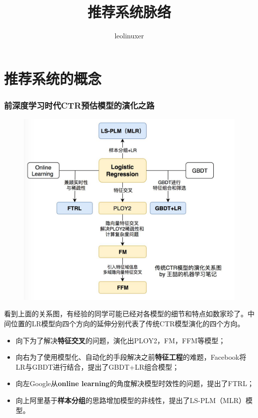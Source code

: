 \documentclass[12pt]{article}
\title{推荐系统脉络\cite{Deep_Learning_Recommender_System}}
\author{leolinuxer}
\begin{document}
\maketitle
\tableofcontents

\part{推荐系统的概念}
\section{前深度学习时代CTR预估模型的演化之路}
\begin{figure}[H]
    \centering
    \includegraphics[width=1\textwidth]{fig/Traditional_CTR_Model_Evolution.jpg}
\end{figure}

看到上面的关系图，有经验的同学可能已经对各模型的细节和特点如数家珍了。中间位置的LR模型向四个方向的延伸分别代表了传统CTR模型演化的四个方向。
\begin{itemize}
\setlength{\itemsep}{0pt}
\setlength{\parsep}{0pt}
\setlength{\parskip}{0pt}
    \item 向下为了解决\textbf{特征交叉}的问题，演化出PLOY2，FM，FFM等模型；
    \item 向右为了使用模型化、自动化的手段解决之前\textbf{特征工程}的难题，Facebook将LR与GBDT进行结合，提出了GBDT+LR组合模型；
    \item 向左Google从\textbf{online learning}的角度解决模型时效性的问题，提出了FTRL；
    \item 向上阿里基于\textbf{样本分组}的思路增加模型的非线性，提出了LS-PLM（MLR）模型。
\end{itemize}
\end{document}
